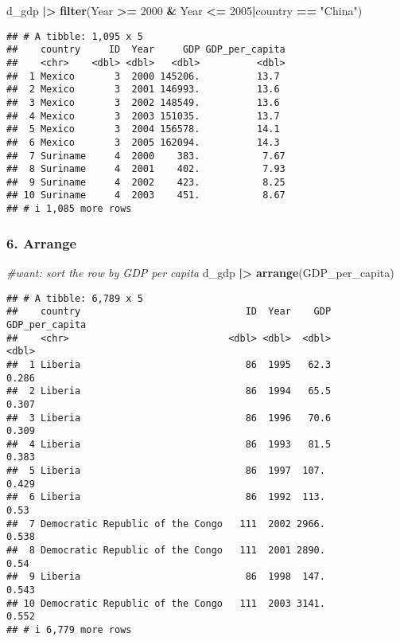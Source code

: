 \documentclass[
]{article}
\newenvironment{Shaded}{\begin{snugshade}}{\end{snugshade}}
\newcommand{\CommentTok}[1]{\textcolor[rgb]{0.56,0.35,0.01}{\textit{#1}}}
\newcommand{\DecValTok}[1]{\textcolor[rgb]{0.00,0.00,0.81}{#1}}
\newcommand{\FunctionTok}[1]{\textcolor[rgb]{0.13,0.29,0.53}{\textbf{#1}}}
\newcommand{\NormalTok}[1]{#1}
\newcommand{\SpecialCharTok}[1]{\textcolor[rgb]{0.81,0.36,0.00}{\textbf{#1}}}
\newcommand{\StringTok}[1]{\textcolor[rgb]{0.31,0.60,0.02}{#1}}
\begin{document}
\begin{Shaded}
\begin{Highlighting}[]
\NormalTok{d\_gdp }\SpecialCharTok{|\textgreater{}} \FunctionTok{filter}\NormalTok{(Year }\SpecialCharTok{\textgreater{}=} \DecValTok{2000} \SpecialCharTok{\&}\NormalTok{ Year }\SpecialCharTok{\textless{}=} \DecValTok{2005}\SpecialCharTok{|}\NormalTok{country }\SpecialCharTok{==} \StringTok{"China"}\NormalTok{)}
\end{Highlighting}
\end{Shaded}

\begin{verbatim}
## # A tibble: 1,095 x 5
##    country     ID  Year     GDP GDP_per_capita
##    <chr>    <dbl> <dbl>   <dbl>          <dbl>
##  1 Mexico       3  2000 145206.          13.7 
##  2 Mexico       3  2001 146993.          13.6 
##  3 Mexico       3  2002 148549.          13.6 
##  4 Mexico       3  2003 151035.          13.7 
##  5 Mexico       3  2004 156578.          14.1 
##  6 Mexico       3  2005 162094.          14.3 
##  7 Suriname     4  2000    383.           7.67
##  8 Suriname     4  2001    402.           7.93
##  9 Suriname     4  2002    423.           8.25
## 10 Suriname     4  2003    451.           8.67
## # i 1,085 more rows
\end{verbatim}

\hypertarget{arrange}{%
\subsubsection{6. Arrange}\label{arrange}}

\begin{Shaded}
\begin{Highlighting}[]
\CommentTok{\#want: sort the row by GDP per capita}
\NormalTok{d\_gdp }\SpecialCharTok{|\textgreater{}} \FunctionTok{arrange}\NormalTok{(GDP\_per\_capita)}
\end{Highlighting}
\end{Shaded}

\begin{verbatim}
## # A tibble: 6,789 x 5
##    country                             ID  Year    GDP GDP_per_capita
##    <chr>                            <dbl> <dbl>  <dbl>          <dbl>
##  1 Liberia                             86  1995   62.3          0.286
##  2 Liberia                             86  1994   65.5          0.307
##  3 Liberia                             86  1996   70.6          0.309
##  4 Liberia                             86  1993   81.5          0.383
##  5 Liberia                             86  1997  107.           0.429
##  6 Liberia                             86  1992  113.           0.53 
##  7 Democratic Republic of the Congo   111  2002 2966.           0.538
##  8 Democratic Republic of the Congo   111  2001 2890.           0.54 
##  9 Liberia                             86  1998  147.           0.543
## 10 Democratic Republic of the Congo   111  2003 3141.           0.552
## # i 6,779 more rows
\end{verbatim}
\end{document}
